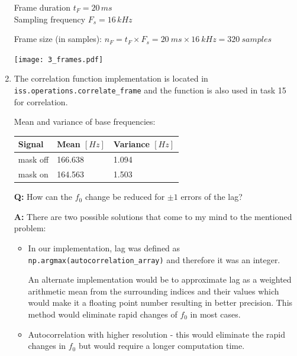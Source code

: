 \documentclass[a4paper, 11pt]{article}
\begin{document}
\begin{enumerate}
        Frame duration $t_F = 20\,ms$ \\
        Sampling frequency $F_s = 16\,kHz$

        Frame size (in samples): $n_F = t_F \times F_s = 20~ms \times 16~kHz = 320~samples$

        \texttt{[image: 3\_frames.pdf]}

        \vspace{2mm}
        \item
        The correlation function implementation is located in \texttt{iss.operations.correlate\_frame}
        and the function is also used in task 15 for correlation.

        Mean and variance of base frequencies: \\
        \begin{tabular}{ | l | l | l | }
            \hline
            \textbf{Signal} & \textbf{Mean} $[Hz]$ & \textbf{Variance} $[Hz]$ \\ \hline
            mask off        & 166.638              & 1.094                    \\ \hline
            mask on         & 164.563              & 1.503                    \\ \hline
        \end{tabular}

        \vspace{2mm}
        \textbf{Q:} How can the $f_0$ change be reduced for $\pm1$ errors of the lag?

        \textbf{A:} There are two possible solutions that come to my mind to the mentioned problem:

        \begin{itemize}
            \item
            In our implementation, lag was defined as \texttt{np.argmax(autocorrelation\_array)} and therefore it was an integer.

            An alternate implementation would be to approximate lag as a weighted arithmetic mean from the surrounding indices and their values
            which would make it a floating point number resulting in better precision.
            This method would eliminate rapid changes of $f_0$ in most cases.

            \item
            Autocorrelation with higher resolution - this would eliminate the rapid changes in $f_0$
            but would require a longer computation time.
        \end{itemize}


\end{enumerate}
\end{document}
